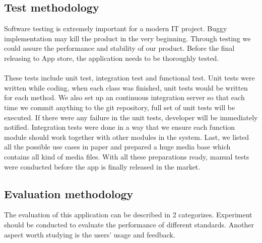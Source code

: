 \subsection{Test methodology}
Software testing is extremely important for a modern IT project. Buggy implementation may kill the product in the very beginning. Through testing we could assure the performance and stability of our product. Before the final releasing to App store, the application needs to be thoroughly tested.\\
\\
These tests include unit test, integration test and functional test.
Unit tests were written while coding, when each class was finished, unit tests would be written for each method. We also set up an continuous integration server so that each time we commit anything to the git repository, full set of unit tests will be executed. If there were any failure in the unit tests, developer will be immediately notified. Integration tests were done in a way that we ensure each function module should work together with other modules in the system. Last, we listed all the possible use cases in paper and prepared a huge media base which contains all kind of media files. With all these preparations ready, manual tests were conducted before the app is finally released in the market.

\subsection{Evaluation methodology}
The evaluation of this application can be described in 2 categorizes. Experiment
should be conducted to evaluate the performance of different standards. Another aspect worth studying is the users' usage and feedback.
